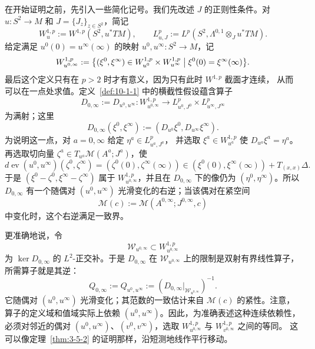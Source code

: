 在开始证明之前，先引入一些简化记号。我们先改述 $J$ 的正则性条件。对
$u:S^2\to M$ 和 $J=\{J_z\}_{z\in S^2}$，简记
\[
  W_u^{1,p}:=W^{1,p}(S^2,u^*TM),
  \qquad
  L_{u,J}^p:=L^p(S^2,\Lambda^{0,1}\otimes_Ju^*TM).
\]
给定满足 $u^0(0)=u^\infty(\infty)$ 的映射
$u^0,u^\infty:S^2\to M$，记
\[
  W_{u^{0,\infty}}^{1,p}
  :=\bigl\{(\xi^0,\xi^\infty)\in
  W_{u^0}^{1,p}\times W_{u^\infty}^{1,p}
  \bigm|\xi^0(0)=\xi^\infty(\infty)\bigr\}.
\]
最后这个定义只有在 $p>2$ 时才有意义，因为只有此时 $W^{1,p}$ 截面才连续，
从而可以在一点处求值。定义~\ref{def:10-1-1} 中的横截性假设蕴含算子
\[
  D_{0,\infty}:=D_{u^0,u^\infty}:
  W_{u^{0,\infty}}^{1,p}
  \longrightarrow L_{u^0,J^0}^p\times L_{u^\infty,J^\infty}^p
\]
为满射；这里
\[
  D_{0,\infty}(\xi^0,\xi^\infty)
  :=(D_{u^0}\xi^0,D_{u^\infty}\xi^\infty).
\]
为说明这一点，对 $a=0,\infty$ 给定 $\eta^a\in L_{u^a,J^a}^p$，
并选取 $\xi^a\in W_{u^a}^{1,p}$ 使 $D_{u^a}\xi^a=\eta^a$。再选取切向量
$\zeta^a\in T_{u^a}\mathcal M(A^a;J^a)$，使
\[
  d\operatorname{ev}(u^0,u^\infty)(\zeta^0,\zeta^\infty)
  =(\zeta^0(0),\zeta^\infty(\infty))
  \in(\xi^0(0),\xi^\infty(\infty))+T_{(x,x)}\Delta.
\]
于是 $(\xi^0-\zeta^0,\xi^\infty-\zeta^\infty)$ 属于
$W_{u^{0,\infty}}^{1,p}$，并且在 $D_{0,\infty}$ 下的像仍为
$(\eta^0,\eta^\infty)$。所以 $D_{0,\infty}$ 有一个随偶对
$(u^0,u^\infty)$ 光滑变化的右逆；当该偶对在紧空间
\[
  \mathcal M(c):=
  \mathcal M(A^{0,\infty};J^{0,\infty},c)
\]
中变化时，这个右逆满足一致界。

更准确地说，令
\[
  \mathcal W_{u^{0,\infty}}\subset W_{u^{0,\infty}}^{1,p}
\]
为 $\ker D_{0,\infty}$ 的 $L^2$-正交补。于是
$D_{0,\infty}$ 在 $\mathcal W_{u^{0,\infty}}$ 上的限制是双射有界线性算子，
所需算子就是其逆：
\[
  Q_{0,\infty}:=Q_{u^0,u^\infty}
  :=\left(D_{0,\infty}\big|_{\mathcal W_{u^{0,\infty}}}\right)^{-1}.
\]
它随偶对 $(u^0,u^\infty)$ 光滑变化；其范数的一致估计来自
$\mathcal M(c)$ 的紧性。注意，算子的定义域和值域实际上依赖
$(u^0,u^\infty)$。因此，为准确表述这种连续依赖性，必须对邻近的偶对
$(u^0,u^\infty)$、$(v^0,v^\infty)$，选取
$W_{u^{0,\infty}}^{1,p}$ 与 $W_{v^{0,\infty}}^{1,p}$ 之间的等同。
这可以像定理~\ref{thm:3-5-2} 的证明那样，沿短测地线作平行移动。

